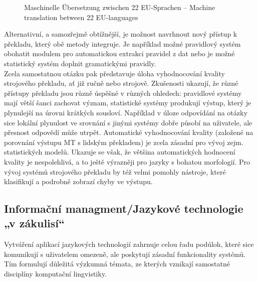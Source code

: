 \begin{multicols}{2}
\begin{figure}[tb]
\begin{tabular}{>{\columncolor{corange1}}cccccccccccccccccccccccc}
    \end{tabular}
  \caption{Maschinelle Übersetzung zwischen 22 EU-Sprachen -- \textcolor{grey1}{Machine translation between 22 EU-languages \cite{euro1}}}
  \label{fig:euromatrix_cz}
\end{figure}
Alternativní, a samozřejmě obtížnější, je možnost navrhnout nový přístup k překladu, který obě metody integruje. Je například možné pravidlový systém obohatit modulem pro automatickou extrakci pravidel z dat nebo je možné statistický systém doplnit gramatickými pravidly.\\
Zcela samostatnou otázku pak představuje úloha vyhodnocování kvality strojového překladu, ať již ručně nebo strojově. Zkušenosti ukazují, že různé přístupy překladu jsou různě úspěšné v různých ohledech: pravidlové systémy mají větší šanci zachovat význam, statistické systémy produkují výstup, který je plynulejší na úrovni krátkých sousloví. Například v úloze odpovídání na otázky sice lokální plynulost ve srovnání s jinými systémy dobře působí na uživatele, ale přesnost odpovědí může utrpět. Automatické vyhodnocování kvality (založené na porovnání výstupu MT s lidským překladem) je zcela zásadní pro vývoj zejm. statistických modelů. Ukazuje se však, že většina automatických hodnocení kvality je nespolehlivá, a to ještě výrazněji pro jazyky s bohatou morfologií. Pro vývoj systémů strojového překladu by též velmi pomohly nástroje, které klasifikují a podrobně zobrazí chyby ve výstupu.

\subsection{Informační managment/Jazykové technologie „v zákulisí“}

Vytváření aplikací jazykových technologií zahrnuje celou řadu podúloh, které sice komunikují s uživatelem omezeně, ale poskytují zásadní funkcionality systémů. Tím formulují důležitá výzkumná témata, ze kterých vznikají samostatné disciplíny komputační lingvistiky.


\end{multicols}
